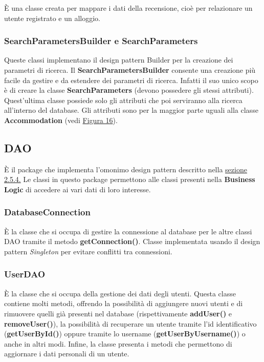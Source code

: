 \documentclass[10pt]{article}
\begin{document}
\`E una classe creata per mappare i dati della recensione, cioè per relazionare un utente registrato e un alloggio.

\subsubsection{SearchParametersBuilder e SearchParameters}

Queste classi implementano il design pattern Builder per la creazione dei parametri di ricerca. Il \textbf{SearchParametersBuilder} consente una creazione più facile da gestire e da estendere dei parametri di ricerca. Infatti il suo unico scopo è di creare la classe \textbf{SearchParameters} (devono possedere gli stessi attributi). Quest'ultima classe possiede solo gli attributi che poi serviranno alla ricerca all'interno del database. Gli attributi sono per la maggior parte uguali alla classe \textbf{Accommodation} (vedi \hyperref[fig:uml]{Figura 16}).

\subsection{DAO}

\`E il package che implementa l'omonimo design pattern descritto nella \hyperref[sezione 2.5.4.]{sezione 2.5.4.} Le classi in questo package permettono alle classi presenti nella \textbf{Business Logic} di accedere ai vari dati di loro interesse.

\subsubsection{DatabaseConnection}

\`E la classe che si occupa di gestire la connessione al database per le altre classi DAO tramite il metodo \textbf{getConnection()}. Classe implementata usando il design pattern \textit{Singleton} per evitare conflitti tra connessioni.

\subsubsection{UserDAO}

\`E la classe che si occupa della gestione dei dati degli utenti. Questa classe contiene molti metodi, offrendo la possibilità di aggiungere nuovi utenti e di rimuovere quelli già presenti nel database (rispettivamente \textbf{addUser()} e \textbf{removeUser()}), la possibilità di recuperare un utente tramite l'id identificativo (\textbf{getUserById()}) oppure tramite lo username (\textbf{getUserByUsername()}) o anche in altri modi. Infine, la classe presenta i metodi che permettono di aggiornare i dati personali di un utente.
\end{document}
